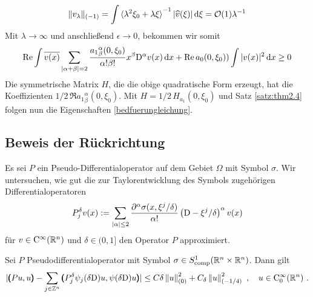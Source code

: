 \begin{align*}
\|v_\lambda\|_{(-1)} = \int \braket{\lambda^2\xi_0+\lambda \xi}^{-1}|\widehat{v}(\xi)|\,\mathrm d\xi = \mathcal{O}(1)\lambda^{-1} 
\end{align*}
Mit $\lambda\to\infty$ und anschließend $\epsilon \to 0$, bekommen wir somit
\begin{align*}
\operatorname{Re}\int \overline{v(x)}\sum_{\lvert\alpha+\beta\rvert=2}\frac{{a_1}^\alpha_\beta(0,\xi_0)}{\alpha!\beta!}x^\beta\mathrm D^\alpha v(x)\,\mathrm d x + \operatorname{Re} a_0(0,\xi_0))\int|v(x)|^2\,\mathrm d x\ge 0
\end{align*}
Die symmetrische Matrix $H$, die die obige quadratische Form erzeugt, hat die Koeffizienten $1/2\,\Re {a_1}^\alpha_\beta(0,\xi_0)$. Mit $H=1/2\, H_{a_1}(0,\xi_0)$ und Satz \ref{satz:thm2.4} folgen nun die Eigenschaften \eqref{bedfuerungleichung}.

\subsection{Beweis der Rückrichtung}

Es sei $P$ ein Pseudo-Differentialoperator auf dem Gebiet $\Omega$ mit Symbol $\sigma$. Wir untersuchen, wie gut die zur Taylorentwicklung des Symbols zugehörigen Differentialoperatoren
\begin{align}
 P_j^\delta v (x):=\sum_{\lvert\alpha\rvert \le 2} \frac{\partial ^\alpha\sigma(x,\xi^j/\delta)}{\alpha!}\left( \mathrm D - \xi^j/\delta\right)^\alpha v(x)
\end{align}
für $v\in\mathrm {C}^\infty(\mathbb R^n)$ und $\delta\in(0,1]$ den Operator $P$ approximiert.

\begin{lem}
Sei $P$ Pseudodifferentialoperator mit Symbol $\sigma\in S^1_{\rm comp}(\mathbb R^n\times\mathbb R^n)$. Dann gilt
\begin{align}\label{hilfsungl1}
\lvert
\pmb(P u,u\pmb) - \sum_{j\in\mathbb Z^n}\pmb( P_j^\delta\psi_j(\delta\mathrm D )u, \psi(\delta\mathrm D )u \pmb)
\rvert
\le C\delta \left\lVert u\right\rVert ^2_{(0)} + C_\delta \left\lVert u\right\rVert ^2_{(-1/4)}\ ,\quad u\in\mathrm {C}^\infty_0(\mathbb R^n)\ .
\end{align}
\end{lem}

